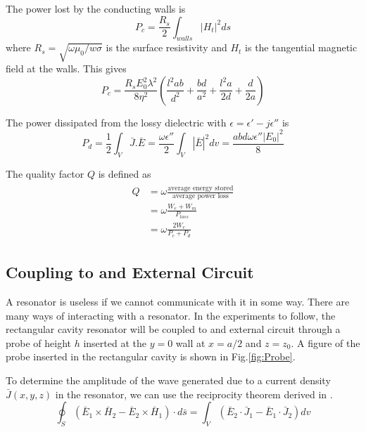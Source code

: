 The power lost by the conducting walls is
\begin{equation}
P_c=\frac{R_s}{2}\int_{walls} |H_t|^2ds
\end{equation}
where $R_s=\sqrt{\omega\mu_0/w\sigma}$ is the surface resistivity and $H_t$ is the tangential magnetic field at the walls. This gives
\begin{equation}
P_c=\frac{R_sE_0^2\lambda^2}{8\eta^2}\left(\frac{l^2ab}{d^2}+\frac{bd}{a^2}+\frac{l^2a}{2d}+\frac{d}{2a}\right)
\end{equation}

The power dissipated from the lossy dielectric with $\epsilon = \epsilon'-j\epsilon''$ is
\begin{equation}
P_d = \frac{1}{2}\int_V\bar{J}.\bar{E}=\frac{\omega\epsilon''}{2}\int_V|\bar{E}|^2dv=\frac{abd\omega\epsilon''|E_0|^2}{8}
\end{equation}

The quality factor $Q$ is defined as
\begin{align}
\begin{split}
Q&=\omega\frac{\text{average energy stored}}{\text{average power loss}}\\
&=\omega\frac{W_e+W_m}{P_{loss}}\\
&=\omega\frac{2W_e}{P_c+P_d}
\end{split}
\end{align}

\subsection{Coupling to and External Circuit}

A resonator is useless if we cannot communicate with it in some way. There are many ways of interacting with a resonator. In the experiments to follow, the rectangular cavity resonator will be coupled to and external circuit through a probe of height $h$ inserted at the $y=0$ wall at $x=a/2$ and $z=z_0$. A figure of the probe inserted in the rectangular cavity is shown in Fig.\ref{fig:Probe}.


To determine the amplitude of the wave generated due to a current density $\bar{J}(x,y,z)$ in the resonator, we can use the reciprocity theorem derived in \cite{Pozar2009}.
\begin{equation}
\label{eqn:reciprocity Th}
\oint_S \left( \bar{E}_1 \times\bar{H}_2 - \bar{E}_2 \times\bar{H}_1\right)\cdot d\bar{s}=\int_V \left(\bar{E}_2\cdot\bar{J}_1 - \bar{E}_1\cdot\bar{J}_2\right)dv
\end{equation}

